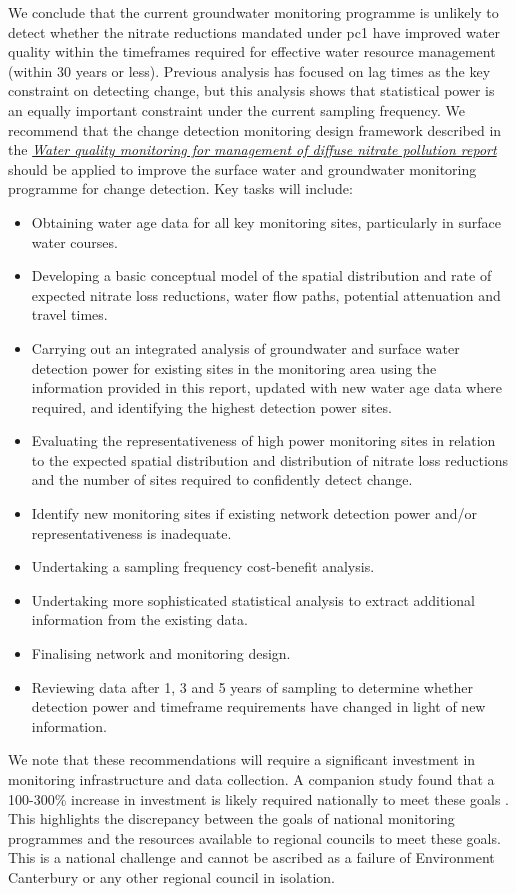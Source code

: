 We conclude that the current groundwater monitoring programme is unlikely to detect whether the nitrate reductions mandated under \gls{pc1} have improved water quality within the timeframes required for effective water resource management (within 30 years or less).
Previous analysis has focused on lag times as the key constraint on detecting change, but this analysis shows that statistical power is an equally important constraint under the current sampling frequency.
We recommend that the change detection monitoring design framework described in the \textit{\href{https://github.com/Komanawa-Solutions-Ltd/gw_detect_power/blob/main/supporting_documents/Water_quality_monitoring_for_management_of_diffuse_nitrate_pollution_Final.pdf}{Water quality monitoring for management of diffuse nitrate pollution report}} \citep{olw_guidance}
should be applied to improve the surface water and groundwater monitoring programme for change detection. Key tasks will include:
\begin{itemize}
    \item Obtaining water age data for all key monitoring sites, particularly in surface water courses.
    \item Developing a basic conceptual model of the spatial distribution and rate of expected nitrate loss reductions, water flow paths, potential attenuation and travel times.
    \item Carrying out an integrated analysis of groundwater and surface water detection power for existing sites in the monitoring area using the information provided in this report, updated with new water age data where required, and identifying the highest detection power sites.
    \item Evaluating the representativeness of high power monitoring sites in relation to the expected spatial distribution and distribution of nitrate loss reductions and the number of sites required to confidently detect change.
    \item Identify new monitoring sites if existing network detection power and/or representativeness is inadequate.
    \item Undertaking a sampling frequency cost-benefit analysis.
    \item Undertaking more sophisticated statistical analysis to extract additional information from the existing data.
    \item Finalising network and monitoring design.
    \item Reviewing data after 1, 3 and 5 years of sampling to determine whether detection power and timeframe requirements have changed in light of new information.
\end{itemize}
We note that these recommendations will require a significant investment in monitoring infrastructure and data collection.  A companion study found that a 100-300\% increase in investment is likely required nationally to meet these goals \citep{dumont_determining_nodate}. This highlights the discrepancy between the goals of national monitoring programmes and the resources available to regional councils to meet these goals. This is a national challenge and cannot be ascribed as a failure of Environment Canterbury or any other regional council in isolation.

